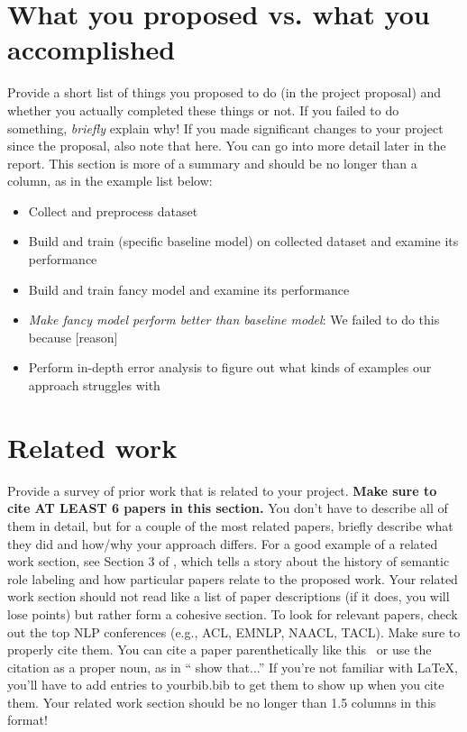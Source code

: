 \documentclass[11pt,a4paper]{article}
\begin{document}
\section{What you proposed vs. what you accomplished}
Provide a short list of things you proposed to do (in the project proposal) and whether you actually completed these things or not. If you failed to do something, \emph{briefly} explain why! If you made significant changes to your project since the proposal, also note that here. You can go into more detail later in the report.  This section is more of a summary and should be no longer than a column, as in the example list below:

\begin{itemize}
\item Collect and preprocess dataset
\item Build and train (specific baseline model) on collected dataset and examine its performance
\item Build and train fancy model and examine its performance
\item \emph{Make fancy model perform better than baseline model}: We failed to do this because [reason]
\item Perform in-depth error analysis to figure out what kinds of examples our approach struggles with
\end{itemize}


\section{Related work}
Provide a survey of prior work that is related to your project. \textbf{Make sure to cite AT LEAST 6 papers in this section.} You don't have to describe all of them in detail, but for a couple of the most related papers, briefly describe what they did and how/why your approach differs. For a good example of a related work section, see Section 3 of \citet{strubell-etal-2018-linguistically}, which tells a story about the history of semantic role labeling and how particular papers relate to the proposed work. Your related work section should not read like a list of paper descriptions (if it does, you will lose points) but rather form a cohesive section. To  look  for  relevant  papers,  check  out  the  top NLP  conferences  (e.g.,  ACL,  EMNLP, NAACL, TACL). Make sure to properly cite them. You can cite a paper parenthetically like this~\citep{andrew2007scalable} or use the citation as a proper noun, as in ``\citet{borsch2011} show that...'' If you're not familiar with LaTeX, you’ll have to add entries to yourbib.bib to get them to show up when you cite them. Your related work section should be no longer than 1.5 columns in this format!
\end{document}
